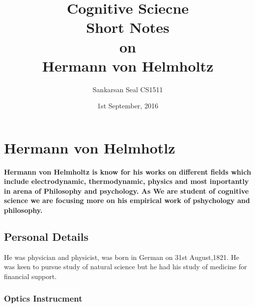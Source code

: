 \documentclass[11pt]{article}
\begin{document}
\title{Cognitive Sciecne\\ Short Notes\\ on\\ Hermann von Helmholtz}
\author{Sankarsan Seal CS1511}
\date{1st September, 2016}
\maketitle

\section{Hermann von Helmhotlz}
\paragraph{Hermann von Helmholtz is know for his works on different fields which include electrodynamic, thermodynamic, physics and most inportantly in arena of Philosophy and psychology. As We are student of cognitive science we are focusing more on his empirical work of pshychology and philosophy.}

\subsection{Personal Details}
He was physician and physicist, was born in German on 31st August,1821. He was keen to pursue study of natural science but he had his study of medicine for financial support.

\subsubsection{Optics Instrucment}
\end{document}
